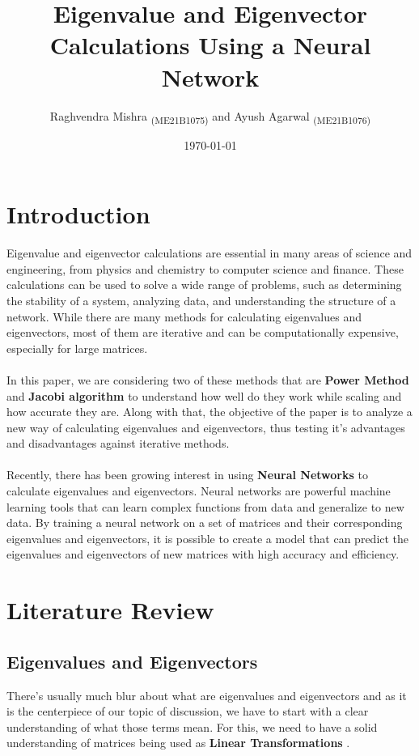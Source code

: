 \documentclass{article}
\title{Eigenvalue and Eigenvector Calculations Using a Neural Network}
\author{Raghvendra Mishra \textsubscript{(ME21B1075)} and Ayush Agarwal \textsubscript{(ME21B1076)}}
\date{\today}
\begin{document}
\maketitle

\section{Introduction}
Eigenvalue and eigenvector calculations are essential in many areas of science and engineering, from physics and chemistry to computer science and finance. These calculations can be used to solve a wide range of problems, such as determining the stability of a system, analyzing data, and understanding the structure of a network. While there are many methods for calculating eigenvalues and eigenvectors, most of them are iterative and can be computationally expensive, especially for large matrices.
\\ \\
In this paper, we are considering two of these methods that are \large \textbf{Power Method} \normalsize and \large \textbf{Jacobi algorithm} \normalsize to understand how well do they work while scaling and how accurate they are. Along with that, the objective of the paper is to analyze a new way of calculating eigenvalues and eigenvectors, thus testing it's advantages and disadvantages against iterative methods.
\\ \\
Recently, there has been growing interest in using \large \textbf{Neural Networks} \normalsize to calculate eigenvalues and eigenvectors. Neural networks are powerful machine learning tools that can learn complex functions from data and generalize to new data. By training a neural network on a set of matrices and their corresponding eigenvalues and eigenvectors, it is possible to create a model that can predict the eigenvalues and eigenvectors of new matrices with high accuracy and efficiency. 

\section{Literature Review}
\subsection{Eigenvalues and Eigenvectors}

There's usually much blur about what are eigenvalues and eigenvectors and as it is the centerpiece of our topic of discussion, we have to start with a clear understanding of what those terms mean. For this, we need to have a solid understanding of matrices being used as \large \textbf{Linear Transformations} \normalsize.
\end{document}
